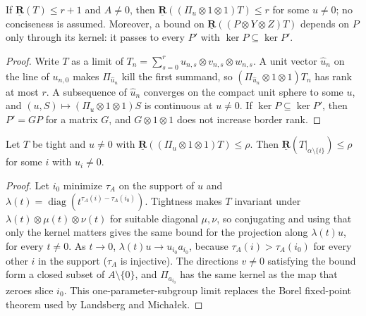\begin{lemma}
  \label{lem:frontiers-border-substitution-step}
  \leanok
  If $\underline{\mathbf{R}}(T) \le r + 1$ and $A \ne 0$, then
  $\underline{\mathbf{R}}((\Pi_u \otimes 1 \otimes 1) T) \le r$ for some $u \ne 0$; no
  conciseness is assumed. Moreover, a bound on
  $\underline{\mathbf{R}}((P \otimes Y \otimes Z) T)$ depends on $P$ only through its
  kernel: it passes to every $P'$ with $\ker P \subseteq \ker P'$.
\end{lemma}
\begin{proof}
  \leanok
  Write $T$ as a limit of $T_n = \sum_{s=0}^{r} u_{n,s} \otimes v_{n,s} \otimes w_{n,s}$.
  A unit vector $\hat u_n$ on the line of $u_{n,0}$ makes $\Pi_{\hat u_n}$ kill the first
  summand, so $(\Pi_{\hat u_n} \otimes 1 \otimes 1) T_n$ has rank at most $r$. A
  subsequence of $\hat u_n$ converges on the compact unit sphere to some $u$, and
  $(u, S) \mapsto (\Pi_u \otimes 1 \otimes 1) S$ is continuous at $u \ne 0$. If
  $\ker P \subseteq \ker P'$, then $P' = G P$ for a matrix $G$, and $G \otimes 1 \otimes 1$
  does not increase border rank.
\end{proof}

\begin{lemma}
  \label{lem:frontiers-torus-limit}
  \leanok
  Let $T$ be tight and $u \ne 0$ with
  $\underline{\mathbf{R}}((\Pi_u \otimes 1 \otimes 1) T) \le \rho$. Then
  $\underline{\mathbf{R}}(T|_{\alpha \setminus \{i\}}) \le \rho$ for some $i$ with
  $u_i \ne 0$.
\end{lemma}
\begin{proof}
  \leanok
  Let $i_0$ minimize $\tau_A$ on the support of $u$ and
  $\lambda(t) = \operatorname{diag}(t^{\tau_A(i) - \tau_A(i_0)})$. Tightness makes $T$
  invariant under $\lambda(t) \otimes \mu(t) \otimes \nu(t)$ for suitable diagonal
  $\mu, \nu$, so conjugating and using that only the kernel matters gives the same bound
  for the projection along $\lambda(t) u$, for every $t \ne 0$. As $t \to 0$,
  $\lambda(t) u \to u_{i_0} a_{i_0}$, because $\tau_A(i) > \tau_A(i_0)$ for every other
  $i$ in the support ($\tau_A$ is injective). The directions $v \ne 0$ satisfying the
  bound form a closed subset of $A \setminus \{0\}$, and $\Pi_{a_{i_0}}$ has the same kernel
  as the map that zeroes slice $i_0$. This one-parameter-subgroup limit replaces the Borel
  fixed-point theorem used by Landsberg and Micha{\l}ek.
\end{proof}

